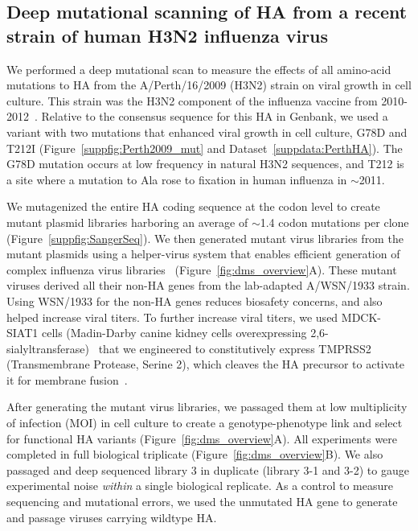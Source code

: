 \documentclass[9pt,twocolumn,twoside]{pnas-new}
\begin{document}
\subsection*{Deep mutational scanning of HA from a recent strain of human H3N2 influenza virus}
We performed a deep mutational scan to measure the effects of all amino-acid mutations to HA from the A/Perth/16/2009 (H3N2) strain on viral growth in cell culture.
This strain was the H3N2 component of the influenza vaccine from 2010-2012~\cite{who2010d,who2011}.
Relative to the consensus sequence for this HA in Genbank, we used a variant with two mutations that enhanced viral growth in cell culture, G78D and T212I (Figure~\ref{suppfig:Perth2009_mut} and Dataset~\ref{suppdata:PerthHA}).
The G78D mutation occurs at low frequency in natural H3N2 sequences, and T212 is a site where a mutation to Ala rose to fixation in human influenza in $\sim$2011.

We mutagenized the entire HA coding sequence at the codon level to create mutant plasmid libraries harboring an average of $\sim$1.4 codon mutations per clone (Figure~\ref{suppfig:SangerSeq}).
We then generated mutant virus libraries from the mutant plasmids using a helper-virus system that enables efficient generation of complex influenza virus libraries~\cite{doud2016accurate} (Figure~\ref{fig:dms_overview}A).
These mutant viruses derived all their non-HA genes from the lab-adapted A/WSN/1933 strain.
Using WSN/1933 for the non-HA genes reduces biosafety concerns, and also helped increase viral titers.
To further increase viral titers, we used MDCK-SIAT1 cells (Madin-Darby canine kidney cells overexpressing 2,6-sialyltransferase)~\cite{matrosovich2003overexpression} that we engineered to constitutively express TMPRSS2 (Transmembrane Protease, Serine 2), which cleaves the HA precursor to activate it for membrane fusion~\cite{bottcher2006proteolytic, bottcher2010cleavage}.

After generating the mutant virus libraries, we passaged them at low multiplicity of infection (MOI) in cell culture to create a genotype-phenotype link and select for functional HA variants (Figure~\ref{fig:dms_overview}A).
All experiments were completed in full biological triplicate (Figure~\ref{fig:dms_overview}B).
We also passaged and deep sequenced library 3 in duplicate (library 3-1 and 3-2) to gauge experimental noise \textit{within} a single biological replicate.
As a control to measure sequencing and mutational errors, we used the unmutated HA gene to generate and passage viruses carrying wildtype HA.
\end{document}
